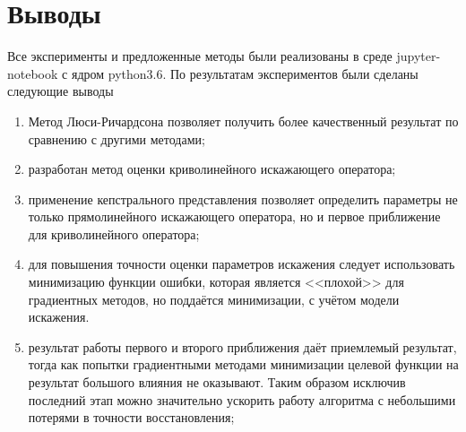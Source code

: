 \section{Выводы}
Все эксперименты и предложенные методы были реализованы в среде jupyter-notebook с ядром python3.6. По результатам экспериментов были сделаны следующие выводы
\begin{enumerate}
	\item Метод Люси-Ричардсона позволяет получить более качественный результат по сравнению с другими методами;
	\item разработан метод оценки криволинейного искажающего оператора;
	\item применение кепстрального представления позволяет определить параметры не только прямолинейного искажающего оператора, но и первое приближение для криволинейного оператора;
	\item для повышения точности оценки параметров искажения следует использовать минимизацию функции ошибки, которая является <<плохой>> для градиентных методов, но поддаётся минимизации, с учётом модели искажения.
	\item результат работы первого и второго приближения даёт приемлемый результат, тогда как попытки градиентными методами минимизации целевой функции на результат большого влияния не оказывают. Таким образом исключив последний этап можно значительно ускорить работу алгоритма с небольшими потерями в точности восстановления;
\end{enumerate}